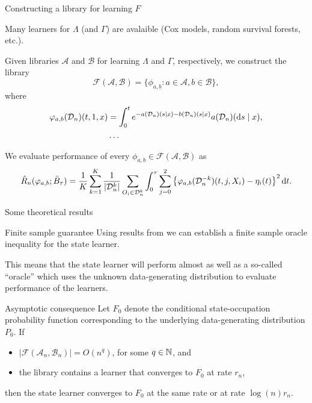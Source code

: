 \documentclass[smaller]{beamer}\usepackage{listings}
\begin{document}
\begin{frame}[label={sec:orgf3d978b}]{Constructing a library for learning \(F\)}
\small

Many learners for \(\Lambda\) (and \(\Gamma\)) are avalaible (Cox models, random
survival forests, etc.).

\vfill

Given libraries \( \mathcal{A} \) and \( \mathcal{B} \) for learning $\Lambda$
and $\Gamma$, respectively,  we construct the library
\begin{equation*}
  \mathcal{F}(\mathcal{A}, \mathcal{B})
  = \{ \phi_{a, b} : a \in \mathcal{A}, b \in \mathcal{B}\},
\end{equation*}
where
\begin{align*}
  \varphi_{a, b}(\mathcal{D}_n)(t,1,x) &= \int_0^t e^{-a(\mathcal{D}_n)(s \mid
    x) -
    b(\mathcal{D}_n)(s \mid x) }  a(\mathcal{D}_n)(\mathop{}\!\mathrm{d} s \mid x),
  \\
  & \dots 
\end{align*}

We evaluate performance of every
\( \phi_{a, b} \in \mathcal{F}(\mathcal{A}, \mathcal{B}) \) as
\begin{equation*}
  \hat{R}_n(\varphi_{a, b}; \bar{B}_{\tau}) =
  \frac{1}{K}\sum_{k=1}^{K}
  \frac{1}{| \mathcal{D}_n^{k} |}\sum_{O_i \in \mathcal{D}_n^{k}}
  \int_0^{\tau} \sum_{j=0}^{2} 
  \left\{
    \varphi_{a, b}(\mathcal{D}_n^{-k})(t,j, X_i) - \eta_i(t)
  \right\}^2 \mathop{}\!\mathrm{d} t.
\end{equation*}
\end{frame}


\begin{frame}[label={sec:orgad5e043}]{Some theoretical results}
\small

\begin{block}{Finite sample guarantee}
Using results from \citep{van2003unicv,van2006oracle} we can establish a finite
sample oracle inequality for the state learner.

\hfill

This means that the state learner will perform almost as well as a so-called
``oracle'' which uses the unknown data-generating distribution to evaluate
performance of the learners.

\hfill
\end{block}

\begin{block}{Asymptotic consequence}
Let \(F_0\) denote the conditional state-occupation probability function
corresponding to the underlying data-generating distribution \(P_0\). If

\begin{itemize}
\item \(|\mathcal{F}(\mathcal{A}_n,\mathcal{B}_n)| = O(n^q)\), for some \(q \in
  \mathbb{N}\), and
\item the library contains a learner that converges to \(F_0\) at rate \(r_n\),
\end{itemize}

then the state learner converges to \(F_0\) at the same rate or at rate \(\log(n) r_n\).
\end{block}
\end{frame}
\end{document}
